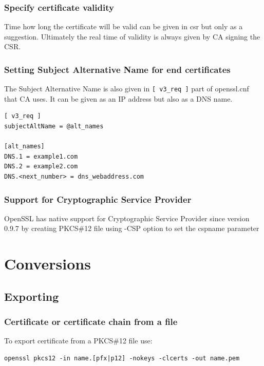 \documentclass[10pt, a4paper]{report}
\begin{document}
    \subsubsection{Specify certificate validity}
    Time how long the certificate will be valid can be given in csr but only as a suggestion. Ultimately the real time of validity is always given by CA signing the CSR.
    \subsubsection{Setting Subject Alternative Name for end certificates}
    The Subject Alternative Name is also given in \verb+[ v3_req ]+ part of openssl.cnf that CA uses. It can be given as an IP address but also as a DNS name.

\begin{verbatim}
[ v3_req ]
subjectAltName = @alt_names

[alt_names]
DNS.1 = example1.com
DNS.2 = example2.com
DNS.<next_number> = dns_webaddress.com
\end{verbatim}

    \subsubsection{Support for Cryptographic Service Provider}
OpenSSL has native support for Cryptographic Service Provider since version 0.9.7 by creating PKCS\#12 file using -CSP option to set the cspname parameter

    
\section{Conversions}

  \subsection{Exporting}
  
    \subsubsection{Certificate or certificate chain from a file}
    To export certificate from a PKCS\#12 file use:
\begin{verbatim}
openssl pkcs12 -in name.[pfx|p12] -nokeys -clcerts -out name.pem
\end{verbatim}
\end{document}
